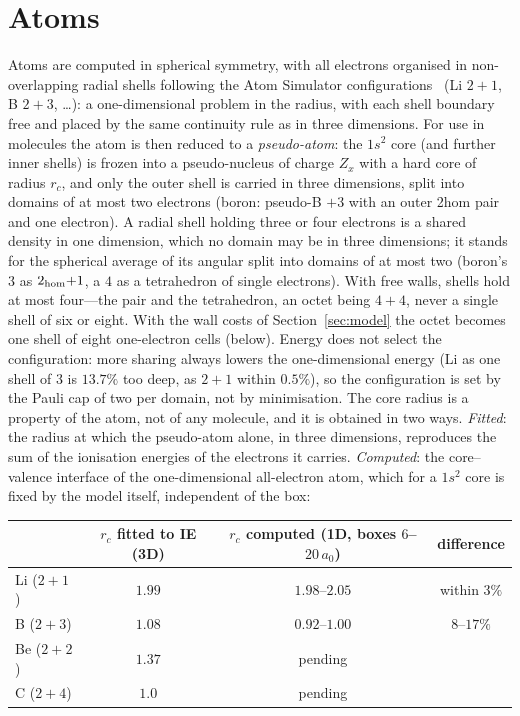 \documentclass[11pt]{article}
\begin{document}
\section{Atoms}
\label{sec:atoms}

Atoms are computed in spherical symmetry, with all electrons organised in non-overlapping radial
shells following the Atom Simulator configurations~\cite{atoms} (Li $2{+}1$, B $2{+}3$, \dots): a
one-dimensional problem in the radius, with each shell boundary free and placed by the same continuity rule as in three dimensions. For
use in molecules the atom is then reduced to a
\emph{pseudo-atom}: the $1s^2$ core (and further inner shells) is frozen into a pseudo-nucleus of
charge $Z_x$ with a hard core of radius $r_c$, and only the outer shell is carried in three
dimensions, split into domains of at most two electrons (boron: pseudo-B $+3$ with an outer 2hom
pair and one electron). A radial shell holding three or four electrons is a shared density in one
dimension, which no domain may be in three dimensions; it stands for the spherical average of its
angular split into domains of at most two (boron's $3$ as $2_{\rm hom}{+}1$, a $4$ as a tetrahedron
of single electrons). With free walls, shells hold at most four---the pair and the tetrahedron, an octet
being $4{+}4$, never a single shell of six or eight. With the wall costs of Section~\ref{sec:model} the
octet becomes one shell of eight one-electron cells (below). Energy does not select the configuration: more
sharing always lowers the one-dimensional energy (Li as one shell of $3$ is $13.7\%$ too deep, as
$2{+}1$ within $0.5\%$), so the configuration is set by the Pauli cap of two per domain, not by
minimisation. The core radius is a property of the atom, not of any molecule, and it is
obtained in two ways. \emph{Fitted}: the radius at which the pseudo-atom alone, in three
dimensions, reproduces the sum of the ionisation energies of the electrons it carries.
\emph{Computed}: the core--valence interface of the one-dimensional all-electron atom, which for a
$1s^2$ core is fixed by the model itself, independent of the box:
\begin{center}
\small
\begin{tabular}{lccc}
\toprule
& $r_c$ fitted to IE (3D) & $r_c$ computed (1D, boxes $6$--$20\,a_0$) & difference \\
\midrule
Li ($2{+}1$) & $1.99$  & $1.98$--$2.05$ & within $3\%$ \\
B  ($2{+}3$) & $1.08$ & $0.92$--$1.00$ & $8$--$17\%$ \\
Be ($2{+}2$) & $1.37$ & pending & \\
C ($2{+}4$)  & $1.0$  & pending & \\
\bottomrule
\end{tabular}
\end{center}
\end{document}
